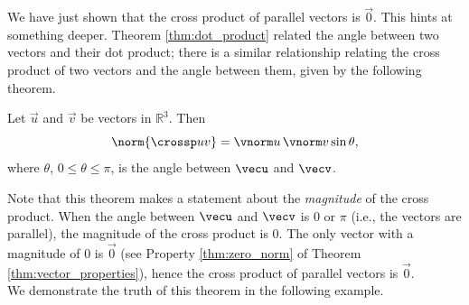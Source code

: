 We have just shown that the cross product of parallel vectors is $\vec 0$. This hints at something deeper. Theorem \ref{thm:dot_product} related the angle between two vectors and their dot product; there is a similar relationship relating the cross product of two vectors and the angle between them, given by the following theorem.

{Let $\vec u$ and $\vec v$ be vectors in $\mathbb{R}^3$. Then
$$\norm{\crossp uv} = \vnorm u\, \vnorm v \sin\theta,$$
where $\theta$, $0\leq \theta \leq \pi$, is the angle between $\vecu$ and $\vecv$.
}

Note that this theorem makes a statement about the \emph{magnitude} of the cross product. When the angle between $\vecu$ and $\vecv$ is 0 or $\pi$ (i.e., the vectors are parallel), the magnitude of the cross product is 0. The only vector with a magnitude of 0 is $\vec 0$ (see Property \ref{thm:zero_norm} of Theorem \ref{thm:vector_properties}), hence the cross product of  parallel vectors is $\vec 0$.\\

We demonstrate the truth of this theorem in the following example.\\

